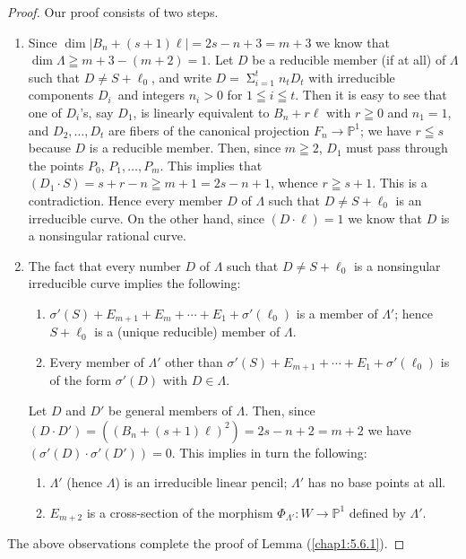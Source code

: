 \begin{proof}
Our proof consists of two steps.
\begin{enumerate}
\renewcommand{\theenumi}{\Roman{enumi}}
\renewcommand{\labelenumi}{(\theenumi)}
\item Since $\dim|B_{n}+(s+1)\ell|=2s-n+3=m+3$ we know that
  $\dim\Lambda\geqq m+3-(m+2)=1$. Let $D$ be a reducible member (if at
  all) of $\Lambda$ such that $D\neq S+\ell_{0}$, and write
  $D={\displaystyle{\mathop{\Sigma}^{t}_{i=1}}}n_{t}D_{t}$ with
  irreducible components $D_{i}$\pageoriginale\ and integers $n_{i}>0$
  for $1\leqq i\leqq t$. Then it is easy to see that one of $D_{i}$'s,
  say $D_{1}$, is linearly equivalent to $B_{n}+r\ell$ with $r\geqq 0$
  and $n_{1}=1$, and $D_{2},\ldots,D_{t}$ are fibers of the canonical
  projection $F_{n}\to \mathbb{P}^{1}$; we have $r\leqq s$ because $D$
  is a reducible member. Then, since $m\geqq 2$, $D_{1}$ must pass
  through the points $P_{0}$, $P_{1},\ldots,P_{m}$. This implies that
  $(D_{1}\cdot S)=s+r-n\geqq m+1=2s-n+1$, whence $r\geqq s+1$. This is
  a contradiction. Hence every member $D$ of $\Lambda$ such that
  $D\neq S+\ell_{0}$ is an irreducible curve. On the other hand, since
  $(D\cdot \ell)=1$ we know that $D$ is a nonsingular rational curve.

\item The fact that every number $D$ of $\Lambda$ such that $D\neq
  S+\ell_{0}$ is a nonsingular irreducible curve implies the
  following:
\begin{enumerate}
\renewcommand{\theenumii}{\roman{enumii}}
\renewcommand{\labelenumii}{(\theenumii)}
\item $\sigma'(S)+E_{m+1}+E_{m}+\cdots+E_{1}+\sigma'(\ell_{0})$ is a
  member of $\Lambda'$; hence $S+\ell_{0}$ is a (unique reducible)
  member of $\Lambda$.

\item Every member of $\Lambda'$ other than $\sigma'(S)+E_{m+1}+\cdots
  +E_{1}+\sigma'(\ell_{0})$ is of the form $\sigma'(D)$ with $D\in
  \Lambda$.
\end{enumerate}

Let $D$ and $D'$ be general members of $\Lambda$. Then, since $(D\cdot
D')=((B_{n}+(s+1)\ell)^{2})=2s-n+2=m+2$ we have $(\sigma'(D)\cdot
\sigma'(D'))=0$. This implies in turn the following:
\begin{enumerate}
\renewcommand{\theenumii}{\roman{enumii}}
\renewcommand{\labelenumii}{(\theenumii)}
\setcounter{enumii}{2}
\item $\Lambda'$ (hence $\Lambda$) is an irreducible linear pencil;
  $\Lambda'$ has no base points at all.

\item $E_{m+2}$ is a cross-section of the morphism
  $\Phi_{\Lambda'}:W\to \mathbb{P}^{1}$ defined by $\Lambda'$.
\end{enumerate}
\end{enumerate}

  The above observations complete the proof of Lemma (\ref{chap1:5.6.1}).
\end{proof}


